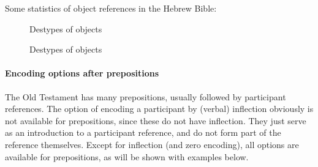 \documentclass{report}
\begin{document}
Some statistics of object references in the Hebrew Bible:

\begin{figure}

\caption{Destypes of objects}
\end{figure}
\begin{figure}

\caption{Destypes of objects}
\end{figure}

\paragraph{Encoding options after prepositions}\label{prep}
The Old Testament has many prepositions, usually followed by participant references. The option of encoding a participant by (verbal) inflection obviously is not available for prepositions, since these do not have inflection. They just serve as an introduction to a participant reference, and do not form part of the reference themselves. Except for inflection (and zero encoding), all options are available for prepositions, as will be shown with examples below.
\end{document}
